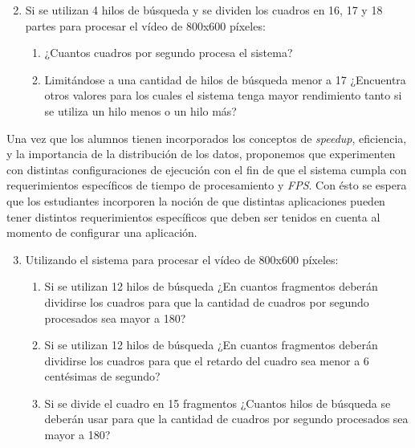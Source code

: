 \begin{enumerate}
	
	\setcounter{enumi}{1}

	\item{Si se utilizan 4 hilos de búsqueda y se dividen los cuadros en 16,
		17 y 18 partes para procesar el vídeo de 800x600 píxeles:

\begin{enumerate}

	\item{¿Cuantos cuadros por segundo procesa el sistema?}

	\item{Limitándose a una cantidad de hilos de búsqueda menor a 17
		¿Encuentra otros valores para los cuales el sistema tenga mayor
		rendimiento tanto si se utiliza un hilo menos o un hilo más?}

\end{enumerate}}


\end{enumerate}

Una vez que los alumnos tienen incorporados los conceptos de \emph{speedup},
eficiencia, y la importancia de la distribución de los datos, proponemos que
experimenten con distintas configuraciones de ejecución con el fin de que el
sistema cumpla con requerimientos específicos de tiempo de procesamiento y
\emph{FPS}. Con ésto se espera que los estudiantes incorporen la noción de que
distintas aplicaciones pueden tener distintos requerimientos específicos que
deben ser tenidos en cuenta al momento de configurar una aplicación.

\begin{enumerate}

	\setcounter{enumi}{2}

	\item{Utilizando el sistema para procesar el vídeo de 800x600 píxeles:

\begin{enumerate}

	\item{Si se utilizan 12 hilos de búsqueda ¿En cuantos fragmentos deberán
		dividirse los cuadros para que la cantidad de cuadros por
		segundo procesados sea mayor a 180?}

	\item{Si se utilizan 12 hilos de búsqueda ¿En cuantos fragmentos deberán
		dividirse los cuadros para que el retardo del cuadro sea menor a
		6 centésimas de segundo?}

	\item{Si se divide el cuadro en 15 fragmentos ¿Cuantos hilos de búsqueda
		se deberán usar para que la cantidad de cuadros por segundo
		procesados sea mayor a 180?}

\end{enumerate}}

\end{enumerate}

